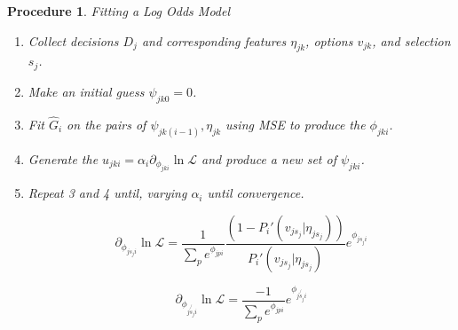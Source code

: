 \documentclass[11pt]{article}
\newtheorem{procedure}{Procedure}
\begin{document}
\begin{procedure}{Fitting a Log Odds Model}
\begin{enumerate}
\item Collect decisions $D_j$ and corresponding features $\eta_{jk}$, options $v_{jk}$, and selection $s_j$. 
\item Make an initial guess $\psi_{jk0} = 0$.
\item Fit $\hat{G}_i$ on the pairs of $\psi_{jk(i-1)},\eta_{jk}$ using MSE to produce the $\phi_{jki}$.
\item Generate the $u_{jki} = \alpha_i \partial_{\phi_{jki}} \ln{\mathcal{L}}$ and produce a new set of $\psi_{jki}$.
\item Repeat 3 and 4 until, varying $\alpha_i$ until convergence. 

$$\partial_{\phi_{js_ji}}\ln{\mathcal{L}}=\frac{1}{\sum_p e^{\phi_{jpi}}}\frac{\left(1-P_i'(v_{js_j} | \eta_{js_j}) \right)}{P_i'(v_{js_j} | \eta_{js_j})}e^{\phi_{js_ji}}$$ 

$$\partial_{\phi_{j\not{s_j}i}}\ln{\mathcal{L}}=\frac{-1 }{\sum_p e^{\phi_{jpi}}}e^{\phi_{j\not{s_j}i}}$$ 
\end{enumerate}

\end{procedure}
\end{document}
